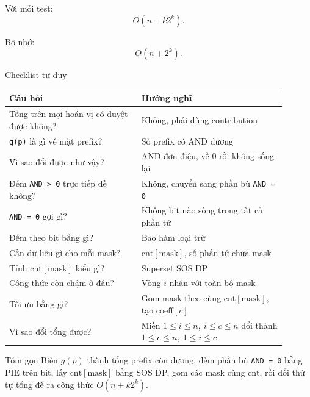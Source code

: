 \documentclass[12pt]{article}
\newcommand{\cnt}{\mathrm{cnt}}
\newcommand{\coef}{\mathrm{coeff}}
\newcommand{\msk}{\mathrm{mask}}
\begin{document}
Với mỗi test:
\[
O(n+k2^k).
\]

Bộ nhớ:
\[
O(n+2^k).
\]

\begin{plainbox}{Checklist tư duy}
\begin{center}
\begin{tabular}{>{\raggedright\arraybackslash}p{0.43\linewidth} p{0.47\linewidth}}
\toprule
Câu hỏi & Hướng nghĩ \\
\midrule
Tổng trên mọi hoán vị có duyệt được không? & Không, phải dùng contribution \\
\texttt{g(p)} là gì về mặt prefix? & Số prefix có AND dương \\
Vì sao đổi được như vậy? & AND đơn điệu, về 0 rồi không sống lại \\
Đếm \texttt{AND > 0} trực tiếp dễ không? & Không, chuyển sang phần bù \texttt{AND = 0} \\
\texttt{AND = 0} gợi gì? & Không bit nào sống trong tất cả phần tử \\
Đếm theo bit bằng gì? & Bao hàm loại trừ \\
Cần dữ liệu gì cho mỗi mask? & \(\cnt[\msk]\), số phần tử chứa mask \\
Tính \(\cnt[\msk]\) kiểu gì? & Superset SOS DP \\
Công thức còn chậm ở đâu? & Vòng \(i\) nhân với toàn bộ mask \\
Tối ưu bằng gì? & Gom mask theo cùng \(\cnt[\msk]\), tạo \(\coef[c]\) \\
Vì sao đổi tổng được? & Miền \(1\le i\le n,\ i\le c\le n\) đổi thành \(1\le c\le n,\ 1\le i\le c\) \\
\bottomrule
\end{tabular}
\end{center}
\end{plainbox}

\begin{resultbox}{Tóm gọn}
Biến \(g(p)\) thành tổng prefix còn dương, đếm phần bù \texttt{AND = 0} bằng PIE trên bit, lấy \(\cnt[\msk]\) bằng SOS DP, gom các mask cùng \(\cnt\), rồi đổi thứ tự tổng để ra công thức \(O(n+k2^k)\).
\end{resultbox}
\end{document}
